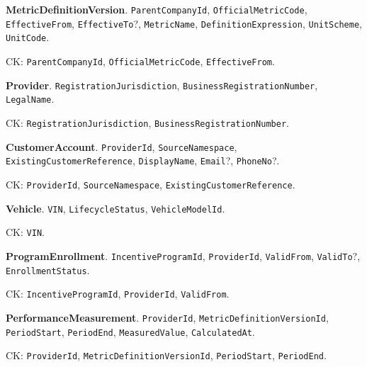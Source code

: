 \par\vspace{2.0pt}\noindent\textbf{MetricDefinitionVersion}. \texttt{Parent\allowbreak{}Company\allowbreak{}Id}, \texttt{Official\allowbreak{}Metric\allowbreak{}Code}, \texttt{Effective\allowbreak{}From}, \texttt{Effective\allowbreak{}To}?, \texttt{Metric\allowbreak{}Name}, \texttt{Definition\allowbreak{}Expression}, \texttt{Unit\allowbreak{}Scheme}, \texttt{Unit\allowbreak{}Code}.\par\noindent CK: \texttt{Parent\allowbreak{}Company\allowbreak{}Id}, \texttt{Official\allowbreak{}Metric\allowbreak{}Code}, \texttt{Effective\allowbreak{}From}.
\par\vspace{2.0pt}\noindent\textbf{Provider}. \texttt{Registration\allowbreak{}Jurisdiction}, \texttt{Business\allowbreak{}Registration\allowbreak{}Number}, \texttt{Legal\allowbreak{}Name}.\par\noindent CK: \texttt{Registration\allowbreak{}Jurisdiction}, \texttt{Business\allowbreak{}Registration\allowbreak{}Number}.
\par\vspace{2.0pt}\noindent\textbf{CustomerAccount}. \texttt{Provider\allowbreak{}Id}, \texttt{Source\allowbreak{}Namespace}, \texttt{Existing\allowbreak{}Customer\allowbreak{}Reference}, \texttt{Display\allowbreak{}Name}, \texttt{Email}?, \texttt{Phone\allowbreak{}No}?.\par\noindent CK: \texttt{Provider\allowbreak{}Id}, \texttt{Source\allowbreak{}Namespace}, \texttt{Existing\allowbreak{}Customer\allowbreak{}Reference}.
\par\vspace{2.0pt}\noindent\textbf{Vehicle}. \texttt{VIN}, \texttt{Lifecycle\allowbreak{}Status}, \texttt{Vehicle\allowbreak{}Model\allowbreak{}Id}.\par\noindent CK: \texttt{VIN}.
\par\vspace{2.0pt}\noindent\textbf{ProgramEnrollment}. \texttt{Incentive\allowbreak{}Program\allowbreak{}Id}, \texttt{Provider\allowbreak{}Id}, \texttt{Valid\allowbreak{}From}, \texttt{Valid\allowbreak{}To}?, \texttt{Enrollment\allowbreak{}Status}.\par\noindent CK: \texttt{Incentive\allowbreak{}Program\allowbreak{}Id}, \texttt{Provider\allowbreak{}Id}, \texttt{Valid\allowbreak{}From}.
\par\vspace{2.0pt}\noindent\textbf{PerformanceMeasurement}. \texttt{Provider\allowbreak{}Id}, \texttt{Metric\allowbreak{}Definition\allowbreak{}Version\allowbreak{}Id}, \texttt{Period\allowbreak{}Start}, \texttt{Period\allowbreak{}End}, \texttt{Measured\allowbreak{}Value}, \texttt{Calculated\allowbreak{}At}.\par\noindent CK: \texttt{Provider\allowbreak{}Id}, \texttt{Metric\allowbreak{}Definition\allowbreak{}Version\allowbreak{}Id}, \texttt{Period\allowbreak{}Start}, \texttt{Period\allowbreak{}End}.
